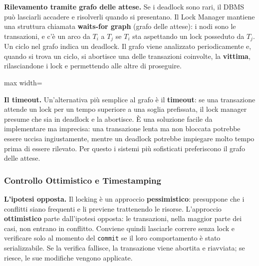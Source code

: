 \documentclass[12pt]{extarticle}
\begin{document}
\medskip
\noindent \textbf{Rilevamento tramite grafo delle attese.} Se i deadlock sono rari, il DBMS può lasciarli accadere e risolverli quando si presentano. Il Lock Manager mantiene una struttura chiamata \textbf{waits-for graph} (grafo delle attese): i nodi sono le transazioni, e c'è un arco da $T_i$ a $T_j$ se $T_i$ sta aspettando un lock posseduto da $T_j$. Un ciclo nel grafo indica un deadlock. Il grafo viene analizzato periodicamente e, quando si trova un ciclo, si abortisce una delle transazioni coinvolte, la \textbf{vittima}, rilasciandone i lock e permettendo alle altre di proseguire.

\begin{center}
\begin{adjustbox}{max width=\linewidth}
\end{adjustbox}
\end{center}

\medskip
\noindent \textbf{Il timeout.} Un'alternativa più semplice al grafo è il \textbf{timeout}: se una transazione attende un lock per un tempo superiore a una soglia prefissata, il lock manager presume che sia in deadlock e la abortisce. È una soluzione facile da implementare ma imprecisa: una transazione lenta ma non bloccata potrebbe essere uccisa ingiustamente, mentre un deadlock potrebbe impiegare molto tempo prima di essere rilevato. Per questo i sistemi più sofisticati preferiscono il grafo delle attese.

\subsubsection{Controllo Ottimistico e Timestamping}

\noindent \textbf{L'ipotesi opposta.} Il locking è un approccio \textbf{pessimistico}: presuppone che i conflitti siano frequenti e li previene trattenendo le risorse. L'approccio \textbf{ottimistico} parte dall'ipotesi opposta: le transazioni, nella maggior parte dei casi, non entrano in conflitto. Conviene quindi lasciarle correre senza lock e verificare solo al momento del \texttt{commit} se il loro comportamento è stato serializzabile. Se la verifica fallisce, la transazione viene abortita e riavviata; se riesce, le sue modifiche vengono applicate.
\end{document}
